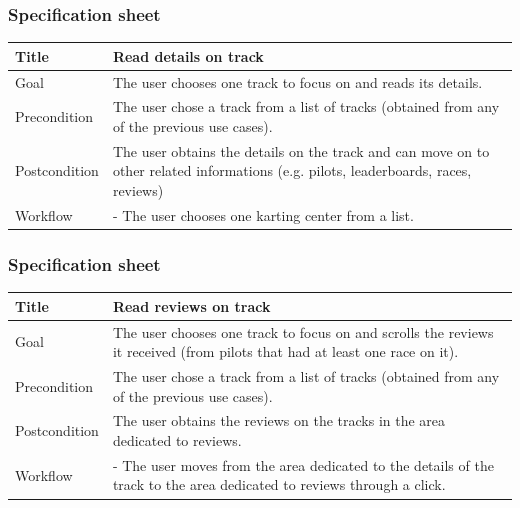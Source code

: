 \documentclass{beamer}
\begin{document}
\begin{frame}
    \frametitle{Specification sheet}
    \begin{table}
        \tiny
        \begin{tabular}{|p{2cm}|p{6cm}|}
        \hline
        Title & \textbf{Read details on track} \\
        \hline
        Goal & The user chooses one track to focus on and reads its details. \\
        \hline
        Precondition & The user chose a track from a list of tracks (obtained from any of the previous use cases).\\
        \hline
        Postcondition & The user obtains the details on the track and can move on to other related informations (e.g. pilots, leaderboards, races, reviews)\\
        \hline
        Workflow &
        - The user chooses one karting center from a list. \\
        \hline
        \end{tabular}
\end{table}
\end{frame}

\begin{frame}
    \frametitle{Specification sheet}
    \begin{table}
        \tiny
        \begin{tabular}{|p{2cm}|p{6cm}|}
        \hline
        Title & \textbf{Read reviews on track} \\
        \hline
        Goal & The user chooses one track to focus on and scrolls the reviews it received (from pilots
        that had at least one race on it). \\
        \hline
        Precondition & The user chose a track from a list of tracks (obtained from any of the previous use cases).\\
        \hline
        Postcondition & The user obtains the reviews on the tracks in the area dedicated to reviews. \\
        \hline
        Workflow &
        - The user moves from the area dedicated to the details of the track to the
        area dedicated to reviews through a click. \\
        \hline
        \end{tabular}
\end{table}
\end{frame}
\end{document}

